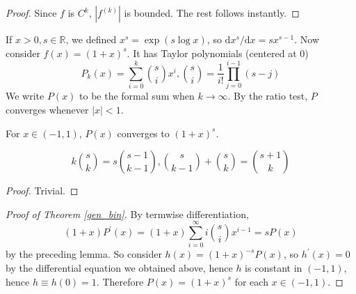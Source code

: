 \begin{proof}
    Since $f$ is $C^k$, $|f^{(k)}|$ is bounded.
    The rest follows instantly.
\end{proof}
If $x>0,s\in\mathbb R$, we defined $x^s=\exp(s\log x)$, so $\mathrm dx^s/\mathrm dx=sx^{s-1}$.
Now consider $f(x)=(1+x)^s$.
It has Taylor polynomials (centered at $0$)
$$P_k(x)=\sum_{i=0}^k\binom{s}{i}x^i,\binom{s}{i}=\frac{1}{i!}\prod_{j=0}^{i-1}(s-j)$$
We write $P(x)$ to be the formal sum when $k\to\infty$.
By the ratio test, $P$ converges whenever $|x|<1$.
\begin{theorem}\label{gen_bin}
    For $x\in (-1,1)$, $P(x)$ converges to $(1+x)^s$.
\end{theorem}
\begin{lemma}
    $$k\binom{s}{k}=s\binom{s-1}{k-1},\binom{s}{k-1}+\binom{s}{k}=\binom{s+1}{k}$$ 
\end{lemma}
\begin{proof}
    Trivial.
\end{proof}
\begin{proof}[Proof of Theorem \ref{gen_bin}]
    By termwise differentiation,
    $$(1+x)P^\prime(x)=(1+x)\sum_{i=0}^\infty i\binom{s}{i}x^{i-1}=sP(x)$$
    by the preceding lemma.
    So consider $h(x)=(1+x)^{-s}P(x)$, so $h^\prime(x)=0$ by the differential equation we obtained above, hence $h$ is constant in $(-1,1)$, hence $h\equiv h(0)=1$.
    Therefore $P(x)=(1+x)^s$ for each $x\in (-1,1)$.
\end{proof}
